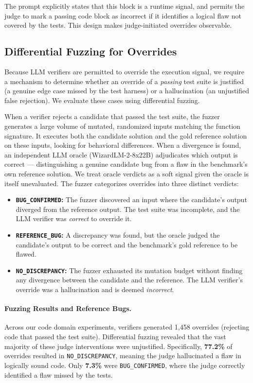 \documentclass{article}
\begin{document}
The prompt explicitly states that this block is a runtime signal, and permits the judge to mark a passing code block as incorrect if it identifies a logical flaw not covered by the tests. This design makes judge-initiated overrides observable.

\subsection{Differential Fuzzing for Overrides}
Because LLM verifiers are permitted to override the execution signal, we require a mechanism to determine whether an override of a \emph{passing} test suite is justified (a genuine edge case missed by the test harness) or a hallucination (an unjustified false rejection). We evaluate these cases using differential fuzzing.

When a verifier rejects a candidate that passed the test suite, the fuzzer generates a large volume of mutated, randomized inputs matching the function signature. It executes both the candidate solution and the gold reference solution on these inputs, looking for behavioral differences. When a divergence is found, an 
independent LLM oracle (WizardLM-2-8x22B) adjudicates which output is 
correct — distinguishing a genuine candidate bug from a flaw in the 
benchmark's own reference solution. We treat oracle verdicts as a soft 
signal given the oracle is itself unevaluated. The fuzzer categorizes 
overrides into three distinct verdicts:

\begin{itemize}
    \item \textbf{\texttt{BUG\_CONFIRMED}:} The fuzzer discovered an input where the candidate's output diverged from the reference output. The test suite was incomplete, and the LLM verifier was \emph{correct} to override it.
    \item \textbf{\texttt{REFERENCE\_BUG}:} A discrepancy was found, but the 
    oracle judged the candidate's output to be correct and the benchmark's gold 
    reference to be flawed.
    \item \textbf{\texttt{NO\_DISCREPANCY}:} The fuzzer exhausted its mutation budget without finding any divergence between the candidate and the reference. The LLM verifier's override was a hallucination and is deemed \emph{incorrect}.
\end{itemize}

\paragraph{Fuzzing Results and Reference Bugs.} 
Across our code domain experiments, verifiers generated 1{,}458 overrides (rejecting code that passed the test suite). Differential fuzzing revealed that the vast majority of these judge interventions were unjustified. Specifically, \textbf{77.2\%} of overrides resulted in \texttt{NO\_DISCREPANCY}, meaning the judge hallucinated a flaw in logically sound code. Only \textbf{7.3\%} were \texttt{BUG\_CONFIRMED}, where the judge correctly identified a flaw missed by the tests.
\end{document}
